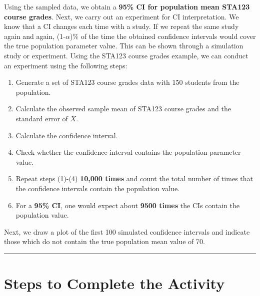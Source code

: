 \documentclass[oneside,openany]{book}
\providecommand{\tightlist}{%
  \setlength{\itemsep}{0pt}\setlength{\parskip}{0pt}}
\begin{document}
Using the sampled data, we obtain a \textbf{95\% CI for population mean STA123 course grades}. Next, we carry out an experiment for CI interpretation. We know that a CI changes each time with a study. If we repeat the same study again and again, (1-\(\alpha\))\% of the time the obtained confidence intervals would cover the true population parameter value. This can be shown through a simulation study or experiment. Using the STA123 course grades example, we can conduct an experiment using the following steps:

\begin{enumerate}
\def\labelenumi{\arabic{enumi}.}
\tightlist
\item
  Generate a set of STA123 course grades data with 150 students from the population.
\item
  Calculate the observed sample mean of STA123 course grades and the standard error of \(\bar{X}\).
\item
  Calculate the confidence interval.
\item
  Check whether the confidence interval contains the population parameter value.
\item
  Repeat steps (1)-(4) \textbf{10,000 times} and count the total number of times that the confidence intervals contain the population value.
\item
  For a \textbf{95\% CI}, one would expect about \textbf{9500 times} the CIs contain the population value.
\end{enumerate}

Next, we draw a plot of the first 100 simulated confidence intervals and indicate those which do not contain the true population mean value of 70.

\begin{center}\rule{0.5\linewidth}{0.5pt}\end{center}

\section{Steps to Complete the Activity}\label{steps-to-complete-the-activity}
\end{document}
